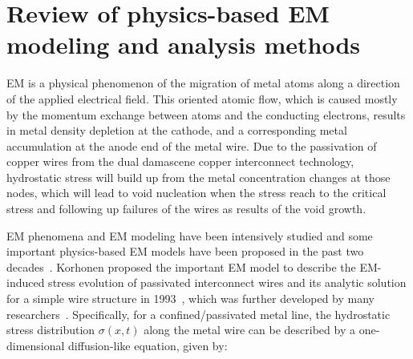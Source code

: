 \section{Review of physics-based EM modeling and analysis methods}
\label{sec:reliability_modeling}

EM is a physical phenomenon of the migration of metal atoms along a
direction of the applied electrical field. This oriented atomic flow,
which is caused mostly by the momentum exchange between atoms and the
conducting electrons, results in metal density depletion at the
cathode, and a corresponding metal accumulation at the anode end of
the metal wire. Due to the passivation of copper wires from the dual
damascene copper interconnect technology, hydrostatic stress will
build up from the metal concentration changes at those nodes, which
will lead to void nucleation when the stress reach to the critical
stress and following up failures of the wires as results of the void
growth.

EM phenomena and EM modeling have been intensively studied and some
important physics-based EM models have been proposed in the past two
decades~\cite{deOrio:2010}. Korhonen proposed the important EM model
to describe the EM-induced stress evolution of passivated interconnect
wires and its analytic solution for a simple wire structure in
1993~\cite{Korhonen:jap1993}, which was further developed by many
researchers~\cite{Clement:1999tcad, Sukharev:2015jap}. Specifically,
for a confined/passivated metal line, the hydrostatic stress
distribution $\sigma(x,t)$ along the metal wire can be described by a
one-dimensional diffusion-like equation, given
by:~\cite{Korhonen:jap1993}
%

